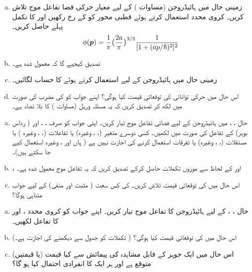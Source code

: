 %
\begin{enumerate}[a.]
\item
زمینی حال میں ہائیڈروجن (مساوات ) کے لیے معیار حرکی فضا تفاعل موج تلاش کریں۔  کروی محدد استعمال کرتے ہوئے قطبی محور کو  کے رخ رکھیں اور  کا تکمل پہلے حاصل کریں۔  
\begin{align} 
\phi ({{\boldsymbol{p}}}) = \frac{1}{\pi} \big ( \frac{2a}{\pi} \big )^{3/2} \frac{1}{[1 + (a p/\hslash)^2]^2}
\end{align}
\item
تصدیق کیجیے گا کہ  معمول شدہ ہے۔ 
\item
زمینی حال میں ہائیڈروجن کے لیے  استعمال کرتے ہوئے  کا حساب لگائیں۔
\item
اس حال میں حرکی توانائی کی توقعاتی قیمت کیا ہوگی؟ اپنے جواب کو  کی مضرب کی صورت میں لکھ کر تصدیق کریں کہ یہ مسئلہ وریل (مساوات ) کا بلا تضاد ہے۔
\end{enumerate}
\begin{enumerate}[a.]
\item
حال ، ،  میں ہائیڈروجن کے لیے فضائی تفاعل موج  تیار کریں۔ اپنی جواب کو صرف ، ،  اور  ( رداس بوہر) کے تفاعل کی صورت میں لکھیں۔ کسی دوسرے متغیر (، ، وغیرہ) یا تفاعلات (، ، وغیرہ ) یا مستقلات (، ، وغیرہ) یا تفرقات استعمال کرنے کی اجازت نہیں ہے ( ہاں   اور ، وغیرہ استعمال کیے جا سکتے ہیں)۔ 
\item
{}،  اور  کے لحاظ سے موزوں تکملات حاصل کرکے تصدیق کریں کہ یہ تفاعل موج معمول شدہ ہے۔ 
\item
اس حال میں  کی توقعاتی قیمت تلاش کریں۔  کی کس سعت ( مثبت اور منفی) کے لیے جواب متناہی ہوگا؟
\end{enumerate}
\begin{enumerate}[a.]
\item
حال ، ،  کے لیے ہائیڈروجن کا تفاعل موج تیار کریں۔ اپنے جواب کو کروی محدد ،  اور  کا تفاعل لکھیں۔
\item
 اس حال میں  کی توقعاتی قیمت کیا ہوگی؟ ( تکملات کو جدول سے دیکھنے کی اجازت ہے۔) 
\item
اس حال میں ایک جوہر کے قابل مشاہدہ  کی پیمائش سے کیا قیمت (یا قیمتیں) متوقع ہے اور ہر ایک کا انفرادی احتمال کیا ہو گا؟ 
\end{enumerate}
